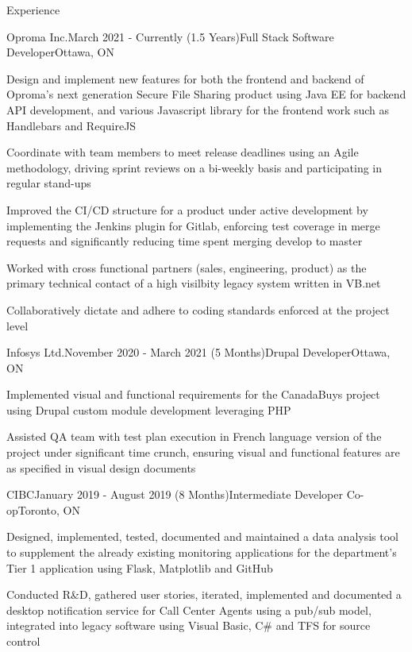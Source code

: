 \documentclass{resume} %
\begin{document}


\begin{rSection}{Experience}
\begin{rSubsection}{Oproma Inc.}{March 2021 - Currently (1.5 Years)}{Full Stack Software Developer}{Ottawa, ON}
\item Design and implement new features for both the frontend and backend of Oproma's next generation Secure File Sharing product using Java EE for backend API development, and various Javascript library for the frontend work such as Handlebars and RequireJS
\item Coordinate with team members to meet release deadlines using an Agile methodology, driving sprint reviews on a bi-weekly basis and participating in regular stand-ups
\item Improved the CI/CD structure for a product under active development by implementing the Jenkins plugin for Gitlab, enforcing test coverage in merge requests and significantly reducing time spent merging develop to master
\item Worked with cross functional partners (sales, engineering, product) as the primary technical contact of a high visilbity legacy system written in VB.net
\item Collaboratively dictate and adhere to coding standards enforced at the project level
\end{rSubsection}

\begin{rSubsection}{Infosys Ltd.}{November 2020 - March 2021 (5 Months)}{Drupal Developer}{Ottawa, ON}
\item Implemented visual and functional requirements for the CanadaBuys project using Drupal custom module development leveraging PHP
\item Assisted QA team with test plan execution in French language version of the project under significant time crunch, ensuring visual and functional features are as specified in visual design documents
\end{rSubsection}

\begin{rSubsection}{CIBC}{January 2019 - August 2019 (8 Months)}{Intermediate Developer Co-op}{Toronto, ON}
\item Designed, implemented, tested, documented and maintained a data analysis tool to supplement the already existing monitoring applications for the department’s Tier 1 application using Flask, Matplotlib and GitHub
\item Conducted R\&D, gathered user stories, iterated, implemented and documented a desktop notification service for Call Center Agents using a pub/sub model, integrated into legacy software using Visual Basic, C\# and TFS for source control
\end{rSubsection}


\end{rSection}
\end{document}
